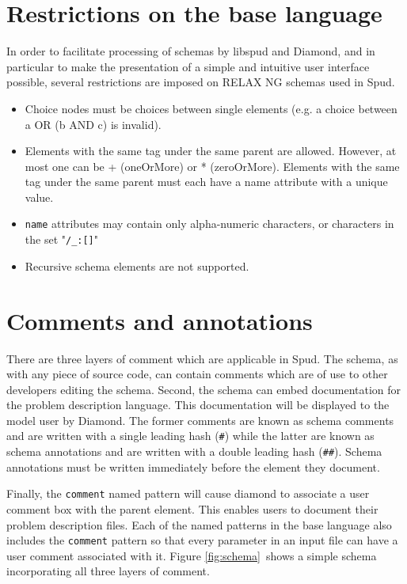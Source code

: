 \documentclass[a4paper, 11pt]{book}
\begin{document}
\section{Restrictions on the base language}

In order to facilitate processing of schemas by libspud and Diamond, and in
particular to make the presentation of a simple and intuitive user interface
possible, several restrictions are imposed on RELAX NG schemas used in Spud.

\begin{itemize}
\item Choice nodes must be choices between single elements (e.g. a choice
  between a OR (b AND c) is invalid).
\item Elements with the same tag under the same parent are allowed. However,
  at most one can be + (oneOrMore) or * (zeroOrMore). Elements with the same
  tag under the same parent must each have a name attribute with a unique
  value.
\item \lstinline+name+ attributes may contain only alpha-numeric characters,
  or characters in the set "\verb+/_:[]+"
\item Recursive schema elements are not supported.
\end{itemize}

\section{Comments and annotations}

There are three layers of comment which are applicable in Spud. The schema,
as with any piece of source code, can contain comments which are of use to
other developers editing the schema. Second, the schema can embed
documentation for the problem description language. This documentation will
be displayed to the model user by Diamond. The former comments are known as
schema comments and are written with a single leading hash (\verb+#+)
while the latter are known as schema annotations and are written with a
double leading hash (\verb+##+). Schema annotations must be written
immediately before the element they document. 

Finally, the \verb+comment+ named pattern will cause diamond to associate a
user comment box with the parent element. This enables users to document
their problem description files. Each of the named patterns in the base
language also includes the \verb+comment+ pattern so that every parameter in
an input file can have a user comment associated with it. Figure
\ref{fig:schema}\ shows a simple schema incorporating all three layers of
comment.
\end{document}
